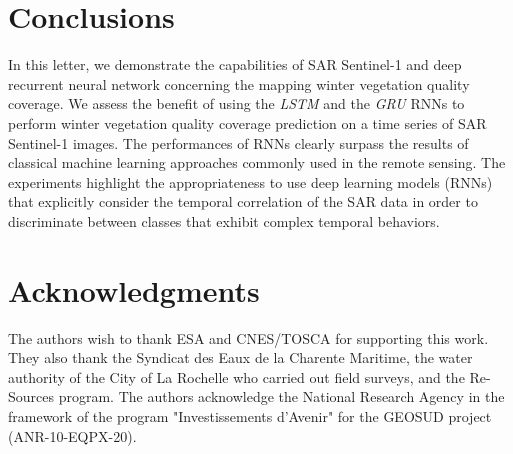 \documentclass[journal, onecolumn]{IEEEtran}
\begin{document}
\section{Conclusions\label{sec:conclusion}}


In this letter, we demonstrate the capabilities of SAR Sentinel-1 and deep recurrent neural network concerning the mapping winter vegetation quality coverage. We assess the benefit of using the \textit{LSTM} and the \textit{GRU} RNNs to perform winter vegetation quality coverage prediction on a time series of SAR Sentinel-1 images. 
The performances of RNNs clearly surpass the results of classical machine learning approaches commonly used in the remote sensing. The experiments highlight the appropriateness to use deep learning models (RNNs) that explicitly consider the temporal correlation of the SAR data in order to discriminate between classes that exhibit complex temporal behaviors. 




\section{Acknowledgments}

The authors wish to thank ESA and CNES/TOSCA for supporting this work.
They also thank the Syndicat des Eaux de la Charente Maritime, the water authority of the City of La Rochelle who carried out field surveys, and the Re-Sources program.
The authors acknowledge the National Research Agency in the framework of the program "Investissements d'Avenir" for the GEOSUD project (ANR-10-EQPX-20).




\end{document}

